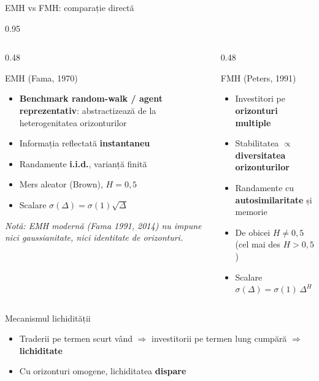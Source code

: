 \documentclass[9pt, aspectratio=169, t]{beamer}
\begin{document}
\begin{frame}[shrink=15]{EMH vs FMH: comparație directă}
\begin{cminipage}{0.95\textwidth}
\begin{columns}[T]
\begin{column}{0.48\textwidth}
\begin{block}{EMH (Fama, 1970)}
\begin{itemize}\setlength{\itemsep}{0pt}
    \item \textbf{Benchmark random-walk / agent reprezentativ}: abstractizează de la heterogenitatea orizonturilor
    \item Informația reflectată \textbf{instantaneu}
    \item Randamente \textbf{i.i.d.}, varianță finită
    \item Mers aleator (Brown), $H=0{,}5$
    \item Scalare $\sigma(\Delta)=\sigma(1)\sqrt{\Delta}$
\end{itemize}
\textit{\footnotesize Notă: EMH modernă (Fama 1991, 2014) nu impune nici gaussianitate, nici identitate de orizonturi.}
\end{block}
\end{column}
\begin{column}{0.48\textwidth}
\begin{alertblock}{FMH (Peters, 1991)}
\begin{itemize}\setlength{\itemsep}{0pt}
    \item Investitori pe \textbf{orizonturi multiple}
    \item Stabilitatea $\propto$ \textbf{diversitatea orizonturilor}
    \item Randamente cu \textbf{autosimilaritate} și memorie
    \item De obicei $H\neq 0{,}5$ (cel mai des $H>0{,}5$)
    \item Scalare $\sigma(\Delta)=\sigma(1)\,\Delta^H$
\end{itemize}
\end{alertblock}
\end{column}
\end{columns}
\vspace{0.2cm}
\begin{exampleblock}{Mecanismul lichidității}
\begin{itemize}\setlength{\itemsep}{0pt}
    \item Traderii pe termen scurt vând $\Rightarrow$ investitorii pe termen lung cumpără $\Rightarrow$ \textbf{lichiditate}
    \item Cu orizonturi omogene, lichiditatea \textbf{dispare}
\end{itemize}
\end{exampleblock}
\end{cminipage}
\end{frame}
\end{document}
